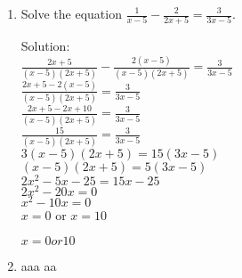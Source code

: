 \begin{enumerate} [leftmargin=0cm] 
    \item Solve the equation $ \frac{1}{x-5} - \frac{2}{2x+5} = \frac{3}{3x-5} $. \\
        \begin{envSolution} 
        \noindent Solution:\\[15pt]     
             $ \frac{2x+5}{(x-5)(2x+5)}-\frac{2(x-5)}{(x-5)(2x+5)} =\frac{3}{3x-5}    $ \\[20pt]
             $ \frac{2x+5-2(x-5)}{(x-5)(2x+5)}=\frac{3}{3x-5}                         $ \\[20pt]
             $\frac{2x+5-2x+10}{(x-5)(2x+5)}=\frac{3}{3x-5}                           $ \\[20pt]
             $\frac{15}{(x-5)(2x+5)}=\frac{3}{3x-5}                                   $ \\[20pt]
             $3(x-5)(2x+5)=15(3x-5)                                                   $ \\[10pt]
             $(x-5)(2x+5)=5(3x-5)                                                     $ \\[10pt]
             $2x^2-5x-25=15x-25                                                       $ \\[10pt]
             $2x^2-20x=0                                                              $ \\[10pt]
             $x^2-10x=0                                                               $ \\[10pt]
             $ x=0 $ or $ x= 10                                                       $ \\
			 
			 
             \begin{envAnswer}[blankline=10] $   x=0 or 10      $ \end{envAnswer}
        \end{envSolution}
        

\item aaa aa \\

\end{enumerate}


